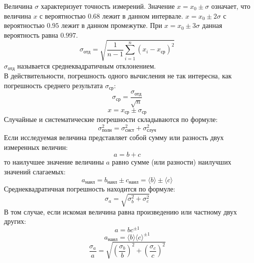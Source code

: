 Величина $\sigma$ характеризует точность измерений. Значение $x = x_0 \pm \sigma$ означает, что величина $x$ с вероятностью $0.68$ лежит в данном интервале. $x = x_0 \pm 2\sigma$ с вероятностью $0.95$ лежит в данном промежутке. При $x=x_0 \pm 3\sigma$ данная вероятность равна $0.997$.
\begin{equation}
\sigma_\text{отд} = \sqrt{\frac{1}{n-1}\sum\limits_{i=1}^n (x_i - x_\text{ср})^2}
\end{equation}
$\sigma_\text{отд}$ называется среднеквадратичным отклонением.\\
В действительности, погрешность одного вычисления не так интересна, как погрешность среднего результата $\sigma_\text{ср}$: 
\begin{equation}
\sigma_\text{ср} = \frac{\sigma_\text{отд}}{\sqrt{n}}
\end{equation}
\begin{equation}
x = x_\text{ср} \pm \sigma_\text{ср}
\end{equation}
Случайные и систематические погрешности складываются по формуле:
\begin{equation}
\sigma_\text{полн}^2 = \sigma_\text{сист}^2 + \sigma_\text{случ}^2
\end{equation}
Если исследуемая величина представляет собой сумму или разность двух измеренных величин:
\begin{equation}
a = b + c
\end{equation}
то наилучшее значение величины $a$ равно сумме (или разности) наилучших значений слагаемых:
\begin{equation}
a_\text{наил} = b_\text{наил} \pm c_\text{наил} = \langle b \rangle \pm \langle c \rangle
\end{equation}
Среднеквадратичная погрешность находится по формуле:
\begin{equation}
\sigma_a = \sqrt{\sigma_b^2 + \sigma_c^2}
\end{equation}
В том случае, если искомая величина равна произведению или частному двух других:
\begin{equation}
a = b c^{\pm 1}
\end{equation}
\begin{equation}
a_\text{наил} = \langle b \rangle \langle c \rangle^{\pm 1}
\end{equation}
\begin{equation}
\frac{\sigma_a}{a} = \sqrt{\left(\frac{\sigma_b}{b}\right)^2 + \left(\frac{\sigma_c}{c}\right)^2}
\end{equation}
